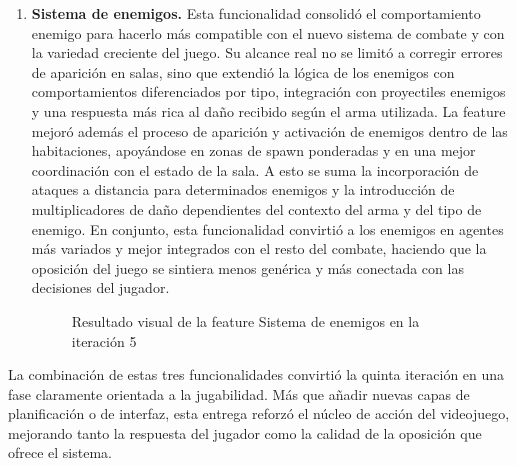\begin{enumerate}
\begin{figure}[H]
\begin{center}
\caption{Resultado visual de la feature Sistema de combate en la iteración 5}
\label{fig:iteracion5-feature-combate}
\end{center}
\end{figure}

\item \textbf{Sistema de enemigos.} Esta funcionalidad consolidó el comportamiento enemigo
para hacerlo más compatible con el nuevo sistema de combate y con la variedad creciente del
juego. Su alcance real no se limitó a corregir errores de aparición en salas, sino que
extendió la lógica de los enemigos con comportamientos diferenciados por tipo, integración
con proyectiles enemigos y una respuesta más rica al daño recibido según el arma utilizada.
La feature mejoró además el proceso de aparición y activación de enemigos dentro de las
habitaciones, apoyándose en zonas de spawn ponderadas y en una mejor coordinación con el
estado de la sala. A esto se suma la incorporación de ataques a distancia para determinados
enemigos y la introducción de multiplicadores de daño dependientes del contexto del arma y
del tipo de enemigo. En conjunto, esta funcionalidad convirtió a los enemigos en agentes
más variados y mejor integrados con el resto del combate, haciendo que la oposición del
juego se sintiera menos genérica y más conectada con las decisiones del jugador.

\begin{figure}[H]
\begin{center}
\caption{Resultado visual de la feature Sistema de enemigos en la iteración 5}
\label{fig:iteracion5-feature-enemigos}
\end{center}
\end{figure}
\end{enumerate}

La combinación de estas tres funcionalidades convirtió la quinta iteración en una fase
claramente orientada a la jugabilidad. Más que añadir nuevas capas de planificación o de
interfaz, esta entrega reforzó el núcleo de acción del videojuego, mejorando tanto la
respuesta del jugador como la calidad de la oposición que ofrece el sistema.

